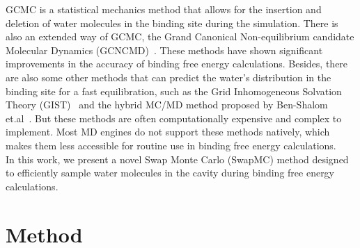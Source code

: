 \documentclass[journal=jacsat,manuscript=article]{achemso}
\begin{document}
GCMC is a statistical mechanics method that allows for the insertion and deletion of water molecules in the binding site during the simulation.
There is also an extended way of GCMC, the Grand Canonical Non-equilibrium candidate Molecular Dynamics (GCNCMD)~\cite{Ge2022, melling2023enhanced, Deng2024}.
These methods have shown significant improvements in the accuracy of binding free energy calculations.
Besides, there are also some other methods that can predict the water's distribution in the binding site for a fast equilibration, 
such as the Grid Inhomogeneous Solvation Theory (GIST)~\cite{Abel2008,Michel2009,Cao2019,Irwin2019} and the hybrid MC/MD method proposed by Ben-Shalom et.al~\cite{ben2021fast}.
But these methods are often computationally expensive and complex to implement. 
Most MD engines do not support these methods natively, which makes them less accessible for routine use in binding free energy calculations.\\
\newline
In this work, we present a novel Swap Monte Carlo (SwapMC) method designed to efficiently sample water molecules in the cavity during binding free energy calculations.



\section{Method}
\end{document}
